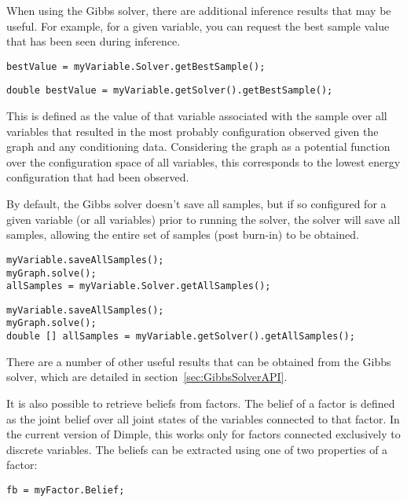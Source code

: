 When using the Gibbs solver, there are additional inference results that may be useful.  For example, for a given variable, you can request the best sample value that has been seen during inference.

\ifmatlab
\begin{lstlisting}
bestValue = myVariable.Solver.getBestSample();
\end{lstlisting}
\fi

\ifjava
\begin{lstlisting}
double bestValue = myVariable.getSolver().getBestSample();
\end{lstlisting}
\fi

This is defined as the value of that variable associated with the sample over all variables that resulted in the most probably configuration observed given the graph and any conditioning data. Considering the graph as a potential function over the configuration space of all variables, this corresponds to the lowest energy configuration that had been observed.

By default, the Gibbs solver doesn't save all samples, but if so configured for a given variable (or all variables) prior to running the solver, the solver will save all samples, allowing the entire set of samples (post burn-in) to be obtained.

\ifmatlab
\begin{lstlisting}
myVariable.saveAllSamples();
myGraph.solve();
allSamples = myVariable.Solver.getAllSamples();
\end{lstlisting}
\fi

\ifjava
\begin{lstlisting}
myVariable.saveAllSamples();
myGraph.solve();
double [] allSamples = myVariable.getSolver().getAllSamples();
\end{lstlisting}
\fi

There are a number of other useful results that can be obtained from the Gibbs solver, which are detailed in section~\ref{sec:GibbsSolverAPI}.

It is also possible to retrieve beliefs from factors.  The belief of a factor is defined as the joint belief over all joint states of the variables connected to that factor.  In the current version of Dimple, this works only for factors connected exclusively to discrete variables.  The beliefs can be extracted using one of two properties of a factor:

\ifmatlab
\begin{lstlisting}
fb = myFactor.Belief;
\end{lstlisting}
\fi



